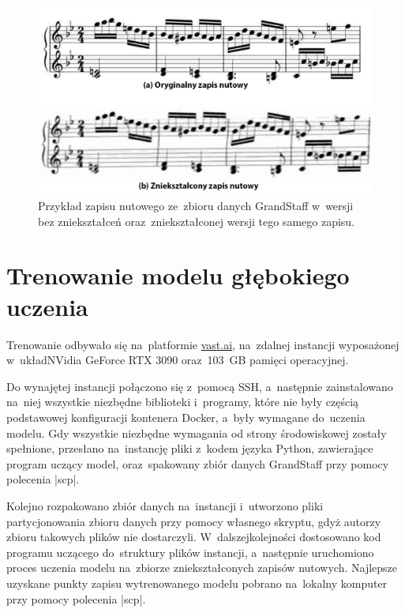 \begin{figure}[htb]
	\centering
	\includegraphics[width=14cm]{images/normal-distorted-GS}
	\caption{Przykład zapisu nutowego ze~zbioru danych GrandStaff w~wersji bez zniekształceń oraz~zniekształconej wersji tego samego zapisu.}
	\label{fig:GS-normal-distorted}
\end{figure}

\section{Trenowanie modelu głębokiego uczenia} \label{ModelTraining}

Trenowanie odbywało się na~platformie \url{vast.ai}, na~zdalnej instancji wyposażonej w~układ\linebreak NVidia GeForce RTX 3090 oraz~103~GB pamięci operacyjnej.

Do wynajętej instancji połączono się z~pomocą SSH, a~następnie zainstalowano na~niej wszystkie niezbędne biblioteki i~programy, które nie były częścią podstawowej konfiguracji kontenera Docker, a~były wymagane do~uczenia modelu. Gdy wszystkie niezbędne wymagania od strony środowiskowej zostały spełnione, przesłano na~instancję pliki z~kodem języka Python, zawierające program uczący model, oraz~spakowany zbiór danych GrandStaff przy pomocy polecenia \pyth|scp|.

Kolejno rozpakowano zbiór danych na~instancji i~utworzono pliki partycjonowania zbioru danych przy pomocy własnego skryptu, gdyż autorzy zbioru takowych plików nie dostarczyli. W~dalszej\linebreak kolejności dostosowano kod programu uczącego do~struktury plików instancji, a~następnie uruchomiono proces uczenia modelu na~zbiorze zniekształconych zapisów nutowych. Najlepsze uzyskane punkty zapisu wytrenowanego modelu pobrano na~lokalny komputer przy pomocy polecenia \pyth|scp|. 

